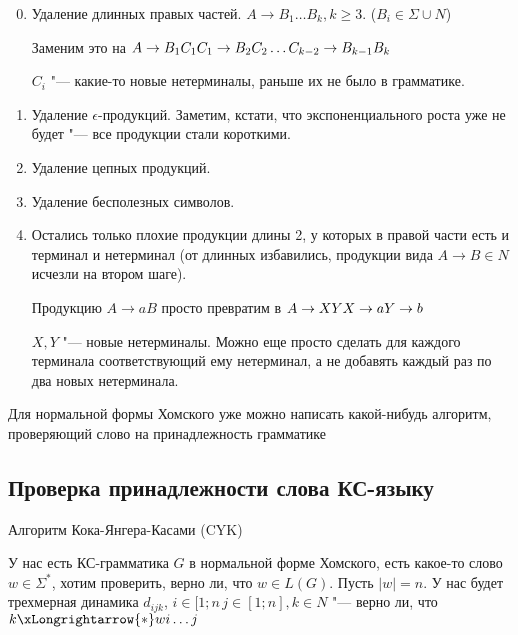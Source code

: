 \begin{enumerate}
\setcounter{enumi}{-1}
\item
Удаление длинных правых частей.
$A \to B_1 \dots B_k, k \geq 3$. ($B_i \in \Sigma \cup N$) 

Заменим это на $\\
A \to B_1C_1 \\
C_1 \to B_2C_2 \\
\dots \\
C_{k-2} \to B_{k-1}B_k$
                                      
$C_i$ "--- какие-то новые нетерминалы, раньше их не было в грамматике.

\item
Удаление $\epsilon$-продукций. Заметим, кстати, что экспоненциального роста уже не будет "--- все продукции стали короткими.

\item
Удаление цепных продукций.

\item
Удаление бесполезных символов.

\item
Остались только плохие продукции длины 2, у которых в правой части есть и терминал и нетерминал (от длинных избавились, продукции вида $A \to B \in N$ исчезли на втором шаге).

Продукцию $A \to aB$ просто превратим в $\\
A \to XY
X \to a
Y \to b
$

$X, Y$ "--- новые нетерминалы.
Можно еще просто сделать для каждого терминала соответствующий ему нетерминал, а не добавять каждый раз по два новых нетерминала.
\end{enumerate}                        

Для нормальной формы Хомского уже можно написать какой-нибудь алгоритм, проверяющий слово на принадлежность грамматике
\subsection{Проверка принадлежности слова КС-языку}
Алгоритм Кока-Янгера-Касами (CYK)

У нас есть КС-грамматика $G$ в нормальной форме Хомского, есть  какое-то слово $w \in \Sigma^*$, хотим проверить, верно ли, что $w \in L(G)$.
Пусть $|w| = n$. 
У нас будет трехмерная динамика $d_{ijk}$, $i \in [1; n\, j \in [1; n], k \in N$ "--- верно ли, что $k \xLongrightarrow{*} w{i\dots j}$

